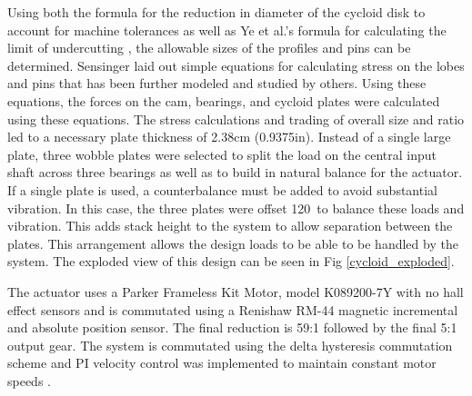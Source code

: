 Using both the formula for the reduction in diameter of the cycloid disk to account for machine tolerances \cite{machine_design} \cite{design_and_application} as well as Ye et al.'s formula for calculating the limit of undercutting \cite{ye}, the allowable sizes of the profiles and pins can be determined.
Sensinger \cite{unified_approach} laid out simple equations for calculating stress on the lobes and pins that has been further modeled and studied by others. Using these equations, the forces on the cam, bearings, and cycloid plates were calculated using these equations. 
The stress calculations and trading of overall size and ratio led to a necessary plate thickness of 2.38cm (0.9375in).
Instead of a single large plate, three wobble plates were selected to split the load on the central input shaft across three bearings as well as to build in natural balance for the actuator.
If a single plate is used, a counterbalance must be added to avoid substantial vibration.
In this case, the three plates were offset 120\textdegree\ to balance these loads and vibration.
This adds stack height to the system to allow separation between the plates.
This arrangement allows the design loads to be able to be handled by the system.
The exploded view of this design can be seen in Fig \ref{cycloid_exploded}.

The actuator uses a Parker Frameless Kit Motor, model K089200-7Y with no hall effect sensors and is commutated using a Renishaw RM-44 magnetic incremental and absolute position sensor.
The final reduction is 59:1 followed by the final 5:1 output gear.
The system is commutated using the delta hysteresis commutation scheme and PI velocity control was implemented to maintain constant motor speeds \cite{electric_machines}.

